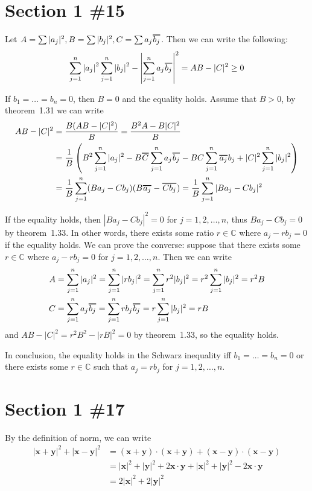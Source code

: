 \documentclass{scrartcl}
\newcommand\Overline[2][0.8pt]{%
  \begin{tikzpicture}[baseline=(a.base)]
    \node[inner xsep=0pt,inner ysep=1.5pt] (a) {$#2$};
    \draw[line width= #1] (a.north west) -- (a.north east);
  \end{tikzpicture}
}
\begin{document}
\section{Section 1 \#15}
Let \(A = \sum |a_j|^2, B = \sum |b_j|^2, C = \sum a_j \Overline{b_j}\).
Then we can write the following:
\[
  \sum_{j=1}^n \left| a_j \right|^2 \sum_{j=1}^n \left| b_j \right|^2 - \left| \sum_{j=1}^n a_j \Overline{b_j} \right|^2 = AB - |C|^2 \geq 0
\]

If \(b_1 = \dots = b_n = 0\), then \(B = 0\) and the equality holds.
Assume that \(B > 0\), by theorem~1.31 we can write
\begin{align*}
  AB - |C|^2 &= \frac{B(AB - |C|^2)}{B} = \frac{B^2 A - B|C|^2}{B} \\
             &= \frac{1}{B} \left( B^2 \sum_{j=1}^n |a_j|^2 - B\Overline{C} \sum_{j=1}^n a_j \Overline{b_j} - BC \sum_{j=1}^n \Overline{a_j}b_j + |C|^2 \sum_{j=1}^n |b_j|^2 \right) \\
             &= \frac{1}{B} \sum_{j=1}^n (Ba_j - Cb_j)(B\Overline{a_j} - \Overline{Cb_j}) = \frac{1}{B} \sum_{j=1}^n |Ba_j - Cb_j|^2
\end{align*}

If the equality holds, then \(|Ba_j - Cb_j|^2 = 0\) for \(j = 1, 2, \dots, n\), thus \(Ba_j - Cb_j = 0\) by theorem~1.33.
In other words, there exists some ratio \(r \in \mathbb{C}\) where \(a_j - rb_j = 0\) if the equality holds.
We can prove the converse: suppose that there exists some \(r \in \mathbb{C}\) where \(a_j - rb_j = 0\) for \(j = 1, 2, \dots, n\).
Then we can write
\begin{align*}
  A &= \sum_{j=1}^n |a_j|^2 = \sum_{j=1}^n |rb_j|^2 = \sum_{j=1}^n r^2 |b_j|^2 = r^2 \sum_{j=1}^n |b_j|^2 = r^2 B \\
  C &= \sum_{j=1}^n a_j \Overline{b_j} = \sum_{j=1}^n rb_j\Overline{b_j} = r\sum_{j=1}^n |b_j|^2 = rB
\end{align*}
and \(AB - |C|^2 = r^2 B^2 - |rB|^2 = 0\) by theorem~1.33, so the equality holds.

In conclusion, the equality holds in the Schwarz inequality iff \(b_1 = \dots = b_n =0\) or there exists some \(r \in \mathbb{C}\) such that \(a_j = rb_j\) for \(j = 1, 2, \dots, n\).

\section{Section 1 \#17}
By the definition of norm, we can write
\begin{align*}
  |\mathbf{x} + \mathbf{y}|^2 + |\mathbf{x} - \mathbf{y}|^2 &= (\mathbf{x} + \mathbf{y}) \cdot (\mathbf{x} + \mathbf{y}) + (\mathbf{x} - \mathbf{y}) \cdot (\mathbf{x} - \mathbf{y}) \\
                                                            &= |\mathbf{x}|^2 + |\mathbf{y}|^2 + 2\mathbf{x} \cdot \mathbf{y} + |\mathbf{x}|^2 + |\mathbf{y}|^2 - 2\mathbf{x} \cdot \mathbf{y} \\
                                                            &= 2|\mathbf{x}|^2 + 2|\mathbf{y}|^2
\end{align*}
\end{document}
